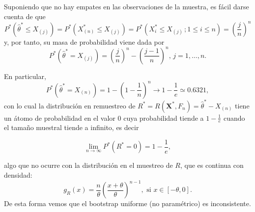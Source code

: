 \documentclass[
  10pt,
]{book}
\renewcommand{\mathbf}[1]{\symbf{#1}}
\theoremstyle{break}
\theoremstyle{nonumberplain}
\begin{document}
Suponiendo que no hay empates en las observaciones de la muestra, es fácil darse cuenta de que
\[P^{\ast}\left( \hat{\theta}^{\ast}\leq X_{(j)} \right)
=P^{\ast}\left( X_{(n)}^{\ast}\leq X_{(j)
} \right) =P^{\ast}\left( X_i^{\ast}\leq X_{(j)}\,;
 1 \leq i \leq n \right) =\left( \frac{j}{n} \right)^{n}\]
y, por tanto, su masa de probabilidad viene dada por
\[P^{\ast}\left( \hat{\theta}^{\ast}=X_{(j)} \right) =\left( 
\frac{j}{n} \right)^{n}-\left( \frac{j-1}{n} \right)^{n}\text{, }j=1,\ldots,n.\]

En particular,
\[P^{\ast}\left( \hat{\theta}^{\ast}=X_{(n)} \right) =1-\left( 1-
\frac{1}{n} \right)^{n}\rightarrow 1-\frac{1}{e}\simeq 0.6321,\]
con lo cual la distribución en remuestreo de \(R^{\ast}=R\left( \mathbf{X}^{\ast},F_n \right) =\hat{\theta}^{\ast}-X_{\left( n \right)}\) tiene un átomo de probabilidad en el valor \(0\) cuya
probabilidad tiende a \(1-\frac{1}{e}\) cuando el tamaño muestral tiende a infinito, es decir

\[\lim_{n\rightarrow \infty }P^{\ast}\left( R^{\ast}=0 \right) =1-\frac{1}{e},\]

algo que no ocurre con la distribución en el muestreo de \(R\), que es continua con densidad:
\[g_R\left( x \right) =\frac{n}{\theta }\left( \frac{x + \theta}{\theta } \right)^{n-1},
\text{ si }x\in \left[ -\theta, 0\right].\]
De esta forma vemos que el bootstrap uniforme (no paramétrico) es inconsistente.
\end{document}
